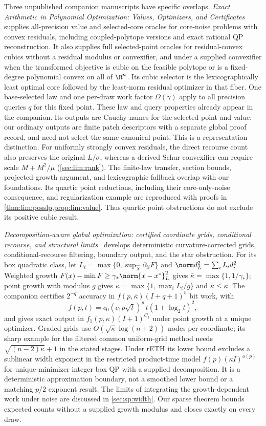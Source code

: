 Three unpublished companion manuscripts have specific overlaps.
\emph{Exact Arithmetic in Polynomial Optimization: Values, Optimizers, and
Certificates}~\citep{companion-exact-arithmetic} supplies all-precision
value and selected-core oracles for core-noise problems with convex
residuals, including coupled-polytope versions and exact rational QP
reconstruction. It also supplies full selected-point oracles for
residual-convex cubics without a residual modulus or convexifier, and under
a supplied convexifier when the transformed objective is cubic on the
feasible polytope or is a fixed-degree polynomial convex on all of $\R^n$.
Its cubic selector is the lexicographically least optimal core followed by
the least-norm residual optimizer in that fiber. One base-selected law and
one per-draw work factor $\Omega(\gamma)$ apply to all precision queries
$q$ for this fixed point. These law and query properties already appear in
the companion. Its outputs are Cauchy names for the selected point and value;
our ordinary outputs are finite patch descriptors with a separate global
proof record, and need not select the same canonical point. This is a
representation distinction. For uniformly strongly convex residuals, the
direct recourse count also preserves the original $L/\sigma$, whereas a
derived Schur convexifier can require scale $M+M^2/\mu$
(\cref{sec:lim:rank}).
The finite-law transfer, section bounds, projected-growth argument, and
lexicographic fallback overlap with our foundations. Its quartic point
reductions, including their core-only-noise consequence, and regularization
example are reproduced with proofs in
\cref{thm:lim:posslp,prop:lim:value}. Thus quartic point obstructions do not
exclude its positive cubic result.

\emph{Decomposition-aware global optimization: certified coordinate grids,
conditional recourse, and structural limits}~\citep{companion-decomposition-aware}
develops deterministic curvature-corrected grids, conditional-recourse
filtering, boundary output, and the star obstruction. For its box quadratic
class, let $L_i=\max\{0,\sup_{\widehat X}\partial_{ii}F\}$ and
$\norm d_L^2=\sum_iL_id_i^2$. Weighted growth
$F(x)-\min F\ge\gamma_*\norm{x-x^*}_L^2$ gives
$\bar\kappa=\max\{1,1/\gamma_*\}$; point growth with modulus $g$ gives
$\kappa=\max\{1,\max_iL_i/g\}$ and $\bar\kappa\le\kappa$. The companion
certifies $2^{-q}$ accuracy in $f(p,\bar\kappa)(I+q+1)^5$ bit work, with
\[
 f(p,t)=c_0(c_1p\sqrt t)^p\,t(1+\log_2t)^2,
\]
and gives exact output in $f_1(p,\kappa)(I+1)^{C_1}$ under point growth at
a unique optimizer. Graded grids use
$O(\sqrt{\bar\kappa}\log(n+2))$ nodes per coordinate; its sharp example
for the filtered common uniform-grid method needs
$\sqrt{(n-2)\kappa}+1$ in the stated stages. Under rETH its lower bound
excludes a sublinear width exponent in the restricted product-time model
$f(p)(\kappa I)^{o(p)}$ for unique-minimizer integer box QP with a supplied
decomposition. It is a
deterministic approximation boundary, not a smoothed lower bound or a
matching $p/2$ exponent result. The limits of integrating the
growth-dependent work under noise are discussed in \cref{sec:sp:width}.
Our sparse theorem bounds expected counts without a supplied growth modulus
and closes exactly on every draw.

